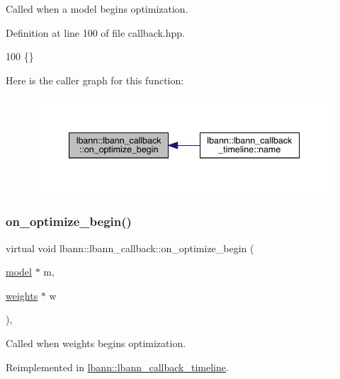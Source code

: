 Called when a model begins optimization. 

Definition at line 100 of file callback.\+hpp.


\begin{DoxyCode}
100 \{\}
\end{DoxyCode}
Here is the caller graph for this function\+:\nopagebreak
\begin{figure}[H]
\begin{center}
\leavevmode
\includegraphics[width=340pt]{classlbann_1_1lbann__callback_a1a9248b305f06419889c1b3b0f0893d8_icgraph}
\end{center}
\end{figure}
\mbox{\label{classlbann_1_1lbann__callback_a497e750da160e0071ce8864ccc3a1344}} 
\subsubsection{\texorpdfstring{on\+\_\+optimize\+\_\+begin()}{on\_optimize\_begin()}\hspace{0.1cm}{\footnotesize\ttfamily [2/2]}}
{\footnotesize\ttfamily virtual void lbann\+::lbann\+\_\+callback\+::on\+\_\+optimize\+\_\+begin (\begin{DoxyParamCaption}\item[{\hyperlink{classlbann_1_1model}{model} $\ast$}]{m,  }\item[{\hyperlink{classlbann_1_1weights}{weights} $\ast$}]{w }\end{DoxyParamCaption})\hspace{0.3cm}{\ttfamily [inline]}, {\ttfamily [virtual]}}

Called when weights begins optimization. 

Reimplemented in \hyperlink{classlbann_1_1lbann__callback__timeline_a2037300798c70d831845c7efaf5de6c2}{lbann\+::lbann\+\_\+callback\+\_\+timeline}.



